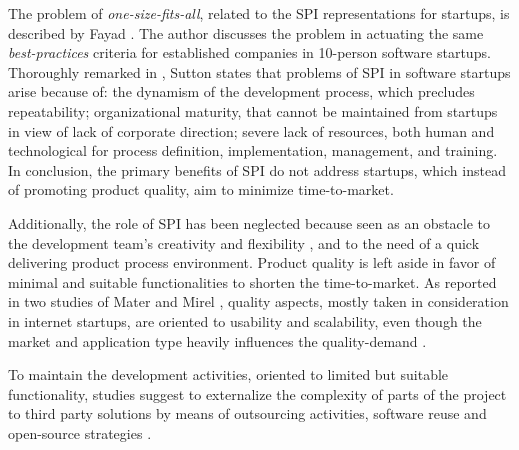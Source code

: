 \documentclass[10pt,journal,letterpaper,compsoc]{IEEEtran}
\begin{document}
The problem of \textit{one-size-fits-all}, related to the SPI  representations for startups, is described by Fayad \cite{Fayad1997}. The author discusses the problem in actuating the same \textit{best-practices} criteria for established companies in 10-person software startups. Thoroughly remarked in \cite{Sutton2000}, Sutton states that problems of SPI in software startups arise because of: the dynamism of the development process, which precludes repeatability; organizational maturity, that cannot be maintained from startups in view of lack of corporate direction; severe lack of resources, both human and technological for process definition, implementation, management, and training. In conclusion, the primary benefits of SPI do not address startups, which instead of promoting product quality, aim to minimize time-to-market.

Additionally, the role of SPI has been neglected because seen as an obstacle to the development team's creativity and flexibility \cite{Coleman2008a}, and to the need of a quick delivering product process environment. %
Product quality is left aside in favor of minimal and suitable functionalities to shorten the time-to-market. As reported in two studies of Mater and Mirel \cite{Mater2000, Mirel2000}, quality aspects, mostly taken in consideration in internet startups, are oriented to usability and scalability, even though the market and application type heavily influences the quality-demand \cite{Coleman2008, Kim2005}.

To maintain the development activities, oriented to limited but suitable functionality, studies suggest to externalize the complexity of parts of the project to third party solutions by means of outsourcing activities, software reuse and open-source strategies \cite{Hanna2010, Jansen2008, Wall2001, Bean2005}. %

\end{document}
